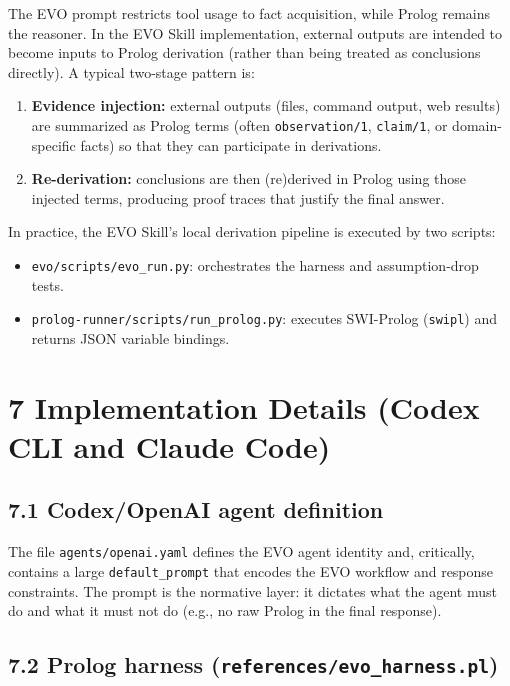 \documentclass[12pt,a4paper]{article}
\begin{document}
The EVO prompt restricts tool usage to fact acquisition, while Prolog remains the reasoner. In the EVO Skill implementation, external outputs are intended to become inputs to Prolog derivation (rather than being treated as conclusions directly). A typical two-stage pattern is:
\begin{enumerate}[leftmargin=*,topsep=2pt,itemsep=2pt]
\item \textbf{Evidence injection:} external outputs (files, command output, web results) are summarized as Prolog terms (often \texttt{observation/1}, \texttt{claim/1}, or domain-specific facts) so that they can participate in derivations.
\item \textbf{Re-derivation:} conclusions are then (re)derived in Prolog using those injected terms, producing proof traces that justify the final answer.
\end{enumerate}

In practice, the EVO Skill's local derivation pipeline is executed by two scripts:
\begin{itemize}[leftmargin=*,topsep=2pt,itemsep=2pt]
\item \texttt{evo/scripts/evo\_run.py}: orchestrates the harness and assumption-drop tests.
\item \texttt{prolog-runner/scripts/run\_prolog.py}: executes SWI-Prolog (\texttt{swipl}) and returns JSON variable bindings.
\end{itemize}

\section{7 Implementation Details (Codex CLI and Claude Code)}

\subsection{7.1 Codex/OpenAI agent definition}

The file \texttt{agents/openai.yaml} defines the EVO agent identity and, critically, contains a large \texttt{default\_prompt} that encodes the EVO workflow and response constraints. The prompt is the normative layer: it dictates what the agent must do and what it must not do (e.g., no raw Prolog in the final response).

\subsection{7.2 Prolog harness (\texttt{references/evo\_harness.pl})}
\end{document}

